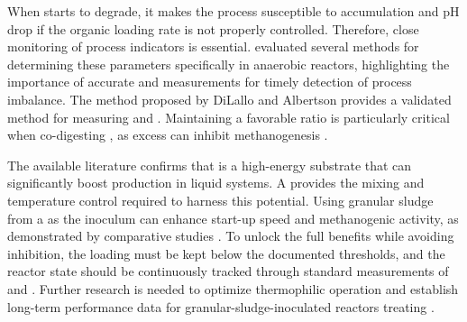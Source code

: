 When  starts to degrade, it makes the  process susceptible to  accumulation and pH drop if the organic loading rate is not properly controlled. Therefore, close monitoring of process indicators is essential. \textcite{ribas2007} evaluated several methods for determining these parameters specifically in anaerobic reactors, highlighting the importance of accurate  and  measurements for timely detection of process imbalance. The method proposed by DiLallo and Albertson  provides a validated method for measuring  and . Maintaining a favorable  ratio is particularly critical when co-digesting , as excess  can inhibit methanogenesis \parencite{tomczak2025}.

The available literature confirms that  is a high-energy substrate that can significantly boost  production in liquid  systems. A  provides the mixing and temperature control required to harness this potential. Using granular sludge from a  as the inoculum can enhance start-up speed and methanogenic activity, as demonstrated by comparative studies \parencite{posmanik2020, li2011}. To unlock the full benefits while avoiding inhibition, the  loading must be kept below the documented thresholds, and the reactor state should be continuously tracked through standard measurements of  and . Further research is needed to optimize thermophilic  operation and establish long-term performance data for granular-sludge-inoculated reactors treating .
